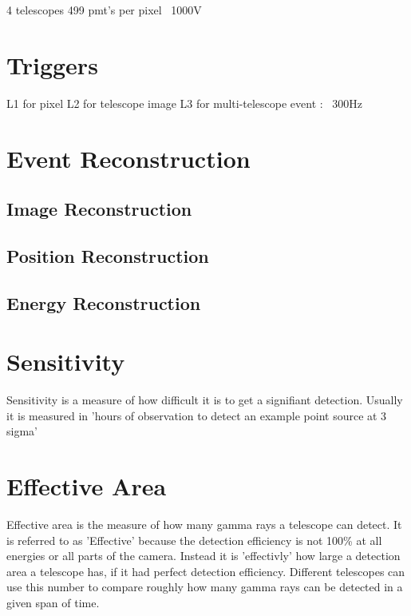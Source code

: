 4 telescopes
499 pmt's per pixel
~1000V

\section{Triggers}\label{sec:trig}
L1 for pixel
L2 for telescope image
L3 for multi-telescope event : ~300Hz

\section{Event Reconstruction}\label{sec:recon}

\subsection{Image Reconstruction}\label{subsec:imgrecon}

\subsection{Position Reconstruction}\label{subsec:posrecon}

\subsection{Energy Reconstruction}\label{subsec:enrecon}

\section{Sensitivity}
Sensitivity is a measure of how difficult it is to get a signifiant detection.
Usually it is measured in 'hours of observation to detect an example point source at 3 sigma'

\section{Effective Area}
Effective area is the measure of how many gamma rays a telescope can detect.
It is referred to as 'Effective' because the detection efficiency is not 100\% at all energies or all parts of the camera.
Instead it is 'effectivly' how large a detection area a telescope has, if it had perfect detection efficiency.
Different telescopes can use this number to compare roughly how many gamma rays can be detected in a given span of time.

